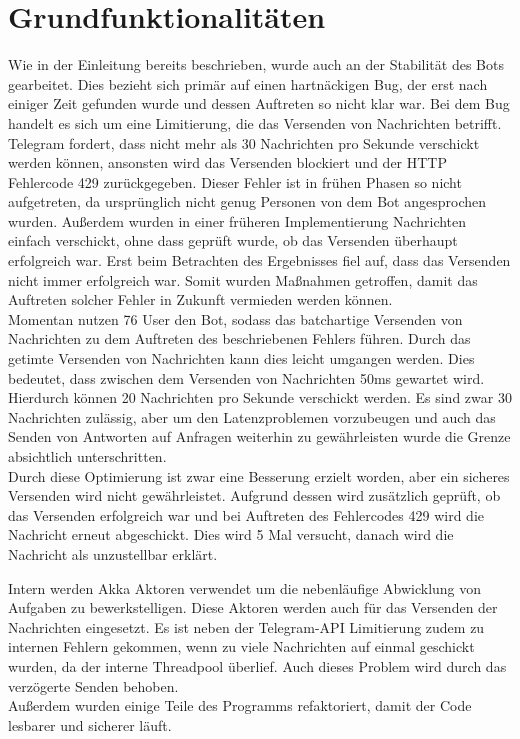 \section{Grundfunktionalitäten}
Wie in der Einleitung bereits beschrieben, wurde auch an der Stabilität des Bots gearbeitet. Dies bezieht sich primär auf einen hartnäckigen Bug, der erst nach einiger Zeit gefunden wurde und dessen Auftreten so nicht klar war.
Bei dem Bug handelt es sich um eine Limitierung, die das Versenden von Nachrichten betrifft. Telegram fordert, dass nicht mehr als 30 Nachrichten pro Sekunde verschickt werden können, ansonsten wird das Versenden blockiert und  der HTTP Fehlercode 429 zurückgegeben. Dieser Fehler ist in frühen Phasen so nicht aufgetreten, da ursprünglich nicht genug Personen von dem Bot angesprochen wurden. Außerdem wurden in einer früheren Implementierung Nachrichten einfach verschickt, ohne dass geprüft wurde, ob das Versenden überhaupt erfolgreich war. Erst beim Betrachten des Ergebnisses fiel auf, dass das Versenden nicht immer erfolgreich war. Somit wurden Maßnahmen getroffen, damit das Auftreten solcher Fehler in Zukunft vermieden werden können. \\
Momentan nutzen 76 User den Bot, sodass das batchartige Versenden von Nachrichten zu dem Auftreten des beschriebenen Fehlers führen. Durch das getimte Versenden von Nachrichten kann dies leicht umgangen werden. Dies bedeutet, dass zwischen dem Versenden von Nachrichten 50ms gewartet wird. Hierdurch können 20 Nachrichten pro Sekunde verschickt werden. Es sind zwar 30 Nachrichten zulässig, aber um den Latenzproblemen vorzubeugen und auch das Senden von Antworten auf Anfragen weiterhin zu gewährleisten wurde die Grenze absichtlich unterschritten. \\
Durch diese Optimierung ist zwar eine Besserung erzielt worden, aber ein sicheres Versenden wird nicht gewährleistet. Aufgrund dessen wird zusätzlich geprüft, ob das Versenden erfolgreich war und bei Auftreten des Fehlercodes 429 wird die Nachricht erneut abgeschickt. Dies wird 5 Mal versucht, danach wird die Nachricht als unzustellbar erklärt.

Intern werden Akka Aktoren verwendet um die nebenläufige Abwicklung von Aufgaben zu bewerkstelligen. Diese Aktoren werden auch für das Versenden der Nachrichten eingesetzt. Es ist neben der Telegram-API Limitierung zudem zu internen Fehlern gekommen, wenn zu viele Nachrichten auf einmal geschickt wurden, da der interne Threadpool überlief. Auch dieses Problem wird durch das verzögerte Senden behoben. \\
Außerdem wurden einige Teile des Programms refaktoriert, damit der Code lesbarer und sicherer läuft.

